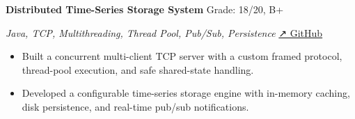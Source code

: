 \documentclass[11pt,a4paper]{article}
\newenvironment{cvitem}[2]{%
  \vspace{0.25em}
  \noindent
  \textbf{\color{heading}#1}%
  \hfill
  {\small\color{muted}#2}%
  \par
}{}
\newcommand{\cvsub}[2]{%
  \noindent
  {\itshape\color{text}#1}%
  \hfill
  {\small\color{muted}#2}%
  \par
}
\newenvironment{cvbullets}{%
  \begin{itemize}[leftmargin=1.2em, itemsep=0em, topsep=0em, parsep=0em]
}{%
  \end{itemize}
}
\begin{document}
\begin{cvitem}{Distributed Time-Series Storage System}{Grade: 18/20, B+}
\cvsub{Java, TCP, Multithreading, Thread Pool, Pub/Sub,
  Persistence}{\href{https://github.com/marcosevegrand}{↗ GitHub}}
\begin{cvbullets}
  \item Built a concurrent multi-client TCP server with a custom framed
    protocol, thread-pool execution, and safe shared-state handling.
  \item Developed a configurable time-series storage engine with in-memory
    caching, disk persistence, and real-time pub/sub notifications.
\end{cvbullets}
\end{cvitem}
\end{document}
